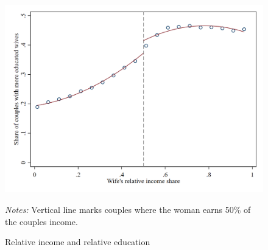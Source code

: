 \begin{figure}[H]
\centering
\caption{Relative income and relative education}
\label{fig:figure_4}
\includegraphics[width=.5\textwidth]{../../results/figures/figure_4.png}
\par \begin{minipage}[h]{\textwidth}{\scriptsize\textit{Notes:} Vertical line marks couples where the woman earns 50\% of the couples income.}\end{minipage}
\end{figure}
